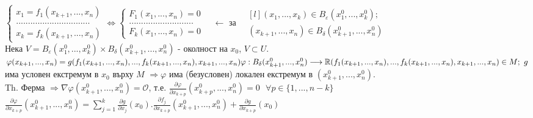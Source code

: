 \documentclass[12pt]{article}
\newcommand{\spc}{\text{ }}
\begin{document}
	\begin{math}
		\begin{cases*}
			x_1 = f_1(x_{k+1},...,x_n)\\
			...............................\\
			x_k=f_k(x_{k+1},...,x_n)
		\end{cases*} \Leftrightarrow
		\begin{cases*}
			F_1(x_1,...,x_n) = 0
			\\
			...........................
			\\
			F_k(x_1,...,x_n) = 0
		\end{cases*}
		\quad
		\leftarrow
		\text{ за }\spc
		\begin{matrix*}[l]
			(x_1,...,x_k)\in B_\varepsilon(x_1^0,...,x_k^0);
			\\
			(x_{k+1},...,x_n) \in B_\delta(x_{k+1}^0,...,x_n^0)
		\end{matrix*}
	\end{math}
	\\
	Нека $V = B_\varepsilon(x_1^0, ..., x_k^0)\times B_\delta(x_{k+1}^0,...,x_n^0)$ - околност на $x_0$, $V\subset U$.\\
	\begin{math}
		\varphi(x_{k+1},...,x_n) = g(f_1(x_{k+1},...,x_n),...,f_k(x_{k+1},...,x_n), x_{k+1}, ..., x_n)\\
		\varphi:B_\delta(x_{k+1}^0,...,x_n^0)\longrightarrow \mathbb{R}\\
		(f_1(x_{k+1},...,x_n), ..., f_k(x_{k+1},...,x_n), x_{k+1},...,x_n)\in M; \spc g
	\end{math}
	има условен екстремум в $x_0$ върху $M$ $\Rightarrow \varphi$ има (безусловен) локален екстремум в $(x_{k+1}^0,...,x_n^0)$.\\
	Th. Ферма $\Rightarrow \nabla \varphi(x_{k+1}^0,...,x_n^0) = \mathcal{O}$, т.е. $\frac{\partial \varphi}{\partial x_{k+p}}(x_{k+p}^0,...,x_n^0)=0 \spc \forall p \in \{1,...,n-k\}$\\
	\begin{math}
		\frac{\partial\varphi}{\partial x_{k+p}}(x_{k+1}^0,...,x_n^0)=\sum_{j=1}^{k}\frac{\partial g}{\partial x_j}(x_0).\frac{\partial f_j}{\partial x_{k+p}}(x_{k+1}^0,...,x_n^0)+\frac{\partial g}{\partial x_{k+p}}(x_0)
	\end{math} 
	
\end{document}
